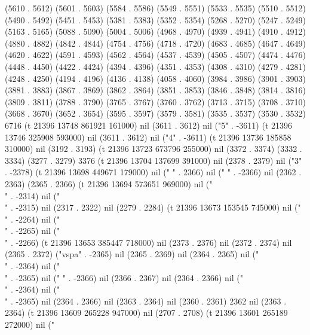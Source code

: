(5610 . 5612) (5601 . 5603) (5584 . 5586) (5549 . 5551) (5533 . 5535) (5510 . 5512) (5490 . 5492) (5451 . 5453) (5381 . 5383) (5352 . 5354) (5268 . 5270) (5247 . 5249) (5163 . 5165) (5088 . 5090) (5004 . 5006) (4968 . 4970) (4939 . 4941) (4910 . 4912) (4880 . 4882) (4842 . 4844) (4754 . 4756) (4718 . 4720) (4683 . 4685) (4647 . 4649) (4620 . 4622) (4591 . 4593) (4562 . 4564) (4537 . 4539) (4505 . 4507) (4474 . 4476) (4448 . 4450) (4422 . 4424) (4394 . 4396) (4351 . 4353) (4308 . 4310) (4279 . 4281) (4248 . 4250) (4194 . 4196) (4136 . 4138) (4058 . 4060) (3984 . 3986) (3901 . 3903) (3881 . 3883) (3867 . 3869) (3862 . 3864) (3851 . 3853) (3846 . 3848) (3814 . 3816) (3809 . 3811) (3788 . 3790) (3765 . 3767) (3760 . 3762) (3713 . 3715) (3708 . 3710) (3668 . 3670) (3652 . 3654) (3595 . 3597) (3579 . 3581) (3535 . 3537) (3530 . 3532) 6716 (t 21396 13748 861921 161000) nil (3611 . 3612) nil ("5" . -3611) (t 21396 13746 325908 593000) nil (3611 . 3612) nil ("4" . -3611) (t 21396 13736 185858 310000) nil (3192 . 3193) (t 21396 13723 673796 255000) nil (3372 . 3374) (3332 . 3334) (3277 . 3279) 3376 (t 21396 13704 137699 391000) nil (2378 . 2379) nil ("3" . -2378) (t 21396 13698 449671 179000) nil ("
" . 2366) nil ("
" . -2366) nil (2362 . 2363) (2365 . 2366) (t 21396 13694 573651 969000) nil ("\\" . -2314) nil ("\\" . -2315) nil (2317 . 2322) nil (2279 . 2284) (t 21396 13673 153545 745000) nil ("
" . -2264) nil ("\\" . -2265) nil ("\\" . -2266) (t 21396 13653 385447 718000) nil (2373 . 2376) nil (2372 . 2374) nil (2365 . 2372) ("vspa" . -2365) nil (2365 . 2369) nil (2364 . 2365) nil ("\\" . -2364) nil ("\\" . -2365) nil ("
" . -2366) nil (2366 . 2367) nil (2364 . 2366) nil ("\\" . -2364) nil ("\\" . -2365) nil (2364 . 2366) nil (2363 . 2364) nil (2360 . 2361) 2362 nil (2363 . 2364) (t 21396 13609 265228 947000) nil (2707 . 2708) (t 21396 13601 265189 272000) nil ("%
